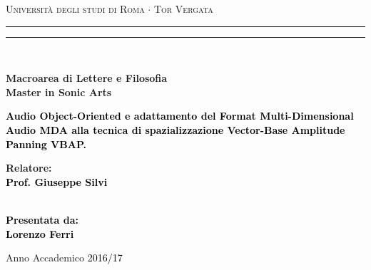 \documentclass[12pt,a4paper]{report}
\begin{document}
\begin{titlepage}
\begin{center}
{\Large{\textsc{Università degli studi di Roma $\cdot$ Tor Vergata}}}
\rule[0.1cm]{15.8cm}{0.1mm}
\rule[0.5cm]{15.8cm}{0.6mm}
\\\vspace{3mm}

{\small{\bf Macroarea di Lettere e Filosofia \\ Master in Sonic Arts}}

\end{center}

\vspace{23mm}

\begin{center}
\begin{spacing}{1.7}
\textcolor{black}{
\linespread{5}
{\LARGE{\bf
Audio Object-Oriented e adattamento del Format Multi-Dimensional Audio MDA alla tecnica di spazializzazione Vector-Base Amplitude Panning VBAP.
}}}

\end{spacing}
\end{center}

\vspace{50mm} \par \noindent

\begin{minipage}[t]{0.47\textwidth}

{\large{\bf Relatore: \vspace{2mm}\\\textcolor{black}{
Prof. Giuseppe Silvi}\\\\

}
}
\end{minipage}
%
\hfill
%
\begin{minipage}[t]{0.47\textwidth}\raggedleft \textcolor{black}{
{\large{\bf Presentata da:
\vspace{2mm}\\
Lorenzo Ferri}}}
\end{minipage}

\vspace{5mm}

\begin{center}

{\large{%

Anno Accademico \textcolor{black}{2016/17}}}
\end{center}

\newpage\null\thispagestyle{empty}

\end{titlepage}
\end{document}
